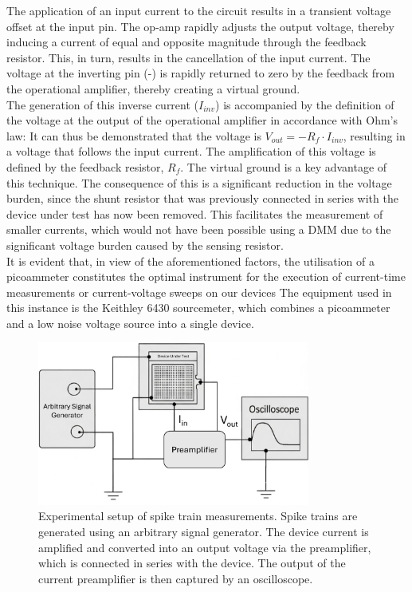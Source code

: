 \noindent The application of an input current to the circuit results in a transient voltage offset at the input pin. The op-amp rapidly adjusts the output voltage, thereby inducing a current of equal and opposite magnitude through the feedback resistor. This, in turn, results in the cancellation of the input current. The voltage at the inverting pin (-) is rapidly returned to zero by the feedback from the operational amplifier, thereby creating a virtual ground. \\

\noindent The generation of this inverse current ($I_{inv}$) is accompanied by the definition of the voltage at the output of the operational amplifier in accordance with Ohm's law: It can thus be demonstrated that the voltage is $V_{out} = -R_f \cdot I_{inv}$, resulting in a voltage that follows the input current. The amplification of this voltage is defined by the feedback resistor, $R_f$. The virtual ground is a key advantage of this technique. The consequence of this is a significant reduction in the voltage burden, since the shunt resistor that was previously connected in series with the device under test has now been removed. This facilitates the measurement of smaller currents, which would not have been possible using a DMM due to the significant voltage burden caused by the sensing resistor. \\

\noindent It is evident that, in view of the aforementioned factors, the utilisation of a picoammeter constitutes the optimal instrument for the execution of current-time measurements or current-voltage sweeps on our devices The equipment used in this instance is the Keithley 6430 sourcemeter, which combines a picoammeter and a low noise voltage source into a single device. \\

\begin{figure}[htbp!] 
    \centering    
    \includegraphics[width=0.8\textwidth]{Chapter3/Figs/f.png}
    \caption[Experimental setup of spike train measurements.]{Experimental setup of spike train measurements. Spike trains are generated using an arbitrary signal generator. The device current is amplified and converted into an output voltage via the preamplifier, which is connected in series with the device. The output of the current preamplifier is then captured by an oscilloscope.}
    \label{fig:3f}
\end{figure}


